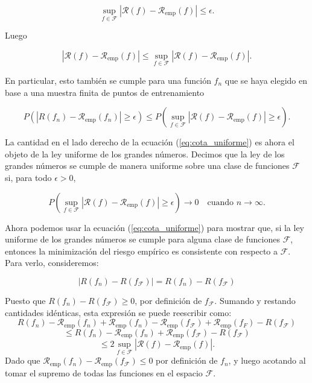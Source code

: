 \documentclass{report}
\begin{document}
\[
\sup_{f \in \mathcal{F}} |\mathcal{R}(f) - \mathcal{R}_{\text{emp}}(f)| \leq \epsilon.
\]

Luego

\[
|\mathcal{R}(f) - \mathcal{R}_{\text{emp}}(f)| \leq \sup_{f \in \mathcal{F}} |\mathcal{R}(f) - \mathcal{R}_{\text{emp}}(f)|.
\]

En particular, esto también se cumple para una función \(f_n\) que se haya elegido en base a una muestra finita 
de puntos de entrenamiento

\begin{equation}
P(|R(f_n) - \mathcal{R}_{\text{emp}}(f_n)| \geq \epsilon) \leq P\left(\sup_{f \in \mathcal{F}} |\mathcal{R}(f) - \mathcal{R}_{\text{emp}}(f)| \geq \epsilon\right). \label{eq:cota_uniforme}
\end{equation}

La cantidad en el lado derecho de la ecuación (\ref{eq:cota_uniforme}) es ahora el objeto de la ley uniforme de los grandes números. 
Decimos que la ley de los grandes números se cumple de manera uniforme sobre una clase de funciones \(\mathcal{F}\) si, 
para todo \(\epsilon > 0\),

\[
P\left(\sup_{f \in \mathcal{F}} |\mathcal{R}(f) - \mathcal{R}_{\text{emp}}(f)| \geq \epsilon \right) \to 0 \quad \text{cuando } n \to \infty.
\]

Ahora podemos usar la ecuación (\ref{eq:cota_uniforme}) para mostrar que, si la ley uniforme de los grandes números se cumple para 
alguna clase de funciones \(\mathcal{F}\), entonces la minimización del riesgo empírico es consistente con respecto a \(\mathcal{F}\). 
Para verlo, consideremos:

\[
|R(f_n) - R(f_\mathcal{F})| = R(f_n) - R(f_\mathcal{F})
\]

Puesto que  \(R(f_n) - R(f_\mathcal{F}) \geq 0\), por definición de \(f_\mathcal{F}\). Sumando y restando cantidades idénticas,
esta expresión se puede reescribir como:
\[
R(f_n) - \mathcal{R}_{\text{emp}}(f_n) + \mathcal{R}_{\text{emp}}(f_n) - \mathcal{R}_{\text{emp}}(f_\mathcal{F}) + \mathcal{R}_{\text{emp}}(f_F) - R(f_\mathcal{F})
\]
\[
    \leq R(f_n) - \mathcal{R}_{\text{emp}}(f_n) + \mathcal{R}_{\text{emp}}(f_\mathcal{F}) - R(f_\mathcal{F})
\] 
\[
    \leq 2 \sup_{f \in \mathcal{F}} |\mathcal{R}(f) - \mathcal{R}_{\text{emp}}(f)|.
\]
Dado que \(\mathcal{R}_{\text{emp}}(f_n) - \mathcal{R}_{\text{emp}}(f_\mathcal{F}) \leq 0\) por definición de \(f_n\), y luego acotando
al tomar el supremo de todas las funciones en el espacio $\mathcal{F}$.\\
\end{document}
